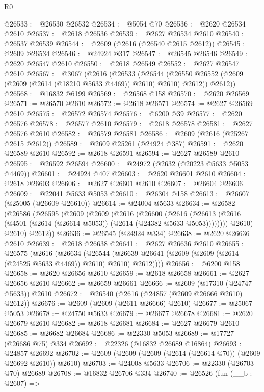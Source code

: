 \begin{lexlean}{R0}
\begin{coremodule}
@26533 := @26530 @26532
@26534 := @5054 @70
@26536 := @2620 @26534 @2610
@26537 := @2618 @26536
@26539 := @2627 @26534 @2610
@26540 := @26537 @26539
@26544 := @2609 (@2616 (@26540 @2615 @2612))
@26545 := @2609 @26534
@26546 := @24924 @317
@26547 := @26545 @26546
@26549 := @2620 @26547 @2610
@26550 := @2618 @26549
@26552 := @2627 @26547 @2610
@26567 := @3067
    (@2616
      (@26533
        (@26544 (@26550 @26552 (@2609 (@2609 (@2614 (@18210 @5633 @4469)) @2610) @2610) @2612))
        @2612))
@26568 := @16832 @6199
@26569 := @26568 @158
@26570 := @2620 @26569
@26571 := @26570 @2610
@26572 := @2618 @26571
@26574 := @2627 @26569 @2610
@26575 := @26572 @26574
@26576 := @6200 @39
@26577 := @2620 @26576
@26578 := @26577 @2610
@26579 := @2618 @26578
@26581 := @2627 @26576 @2610
@26582 := @26579 @26581
@26586 := @2609 (@2616 (@25267 @2615 @2612))
@26589 := @2609 @25261 (@24924 @387)
@26591 := @2620 @26589 @2610
@26592 := @2618 @26591
@26594 := @2627 @26589 @2610
@26595 := @26592 @26594
@26600 := @24972 (@2632 (@20223 @5633 @5053 @4469))
@26601 := @24924 @407
@26603 := @2620 @26601 @2610
@26604 := @2618 @26603
@26606 := @2627 @26601 @2610
@26607 := @26604 @26606
@26609 := @22041 @5633 @5053
@26610 := @26304 @158
@26613 := @26607 (@25005 (@26609 @26610))
@26614 := @24004 @5633
@26634 := @26582
    (@26586
      (@26595
        (@2609
          (@2609
            (@2616
              (@26600
                (@2616
                  (@26613 (@2616 (@4501 (@2614 (@26614 @5053)) (@2614 (@24382 @5633 @5053))))))))
            @2610)
          @2610)
        @2612))
@26636 := @26545 (@24924 @334)
@26638 := @2620 @26636 @2610
@26639 := @2618 @26638
@26641 := @2627 @26636 @2610
@26655 := @26575
    (@2616
      (@26634
        (@26544 (@26639 @26641 (@2609 (@2609 (@2614 (@24525 @5633 @4469)) @2610) @2610) @2612))))
@26656 := @6200 @158
@26658 := @2620 @26656 @2610
@26659 := @2618 @26658
@26661 := @2627 @26656 @2610
@26662 := @26659 @26661
@26666 := @2609 (@17310 (@24747 @5633)) @2610
@26672 := @26540 (@2616 (@24857 (@2609 @26666 @2610) @2612))
@26676 := @2609 (@2609 (@2611 @26666) @2610)
@26677 := @25067 @5053
@26678 := @24750 @5633
@26679 := @26677 @26678
@26681 := @2620 @26679 @2610
@26682 := @2618 @26681
@26684 := @2627 @26679 @2610
@26685 := @26682 @26684
@26686 := @22330 @5053
@26689 := @17727 (@26686 @75) @334
@26692 := @22326 (@16832 @26689 @16864)
@26693 := @24857 @26692
@26702 := @2609 (@2609 (@2609 (@2614 (@26614 @70)) (@2609 @26692 @2610)) @2610)
@26703 := @24008 @5633
@26706 := @22330 (@26703 @70) @26689
@26708 := @16832 @26706 @334
@26740 := @26526
    (fun (__b : @2607) =>

\end{coremodule}
\end{lexlean}
